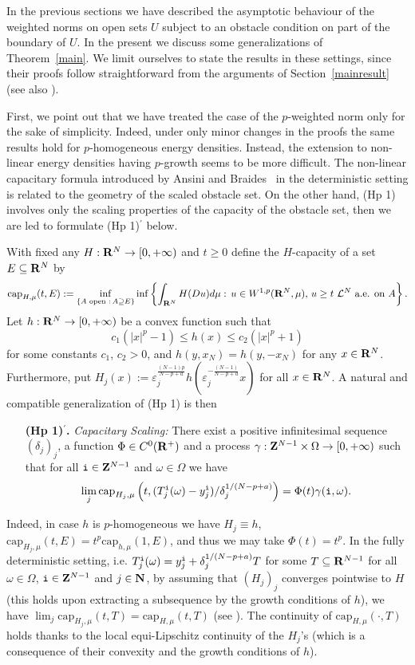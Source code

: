 \documentclass[10pt,reqno]{amsart}
\numberwithin{equation}{section}
\def\L{{\mathcal L}}
\def\N{{\bf N}}
\def\R{{\bf R}}
\def\Z{{\bf Z}}
\def\eps{{\varepsilon}_j}
\def\ii{{\tt i}}
\def\Wsp{W^{1,p}}
\def\Om{\Omega}
\def\om{\omega}
\def\deltaj{\delta_j}
\def\deltae{\delta_{j}}
\def\Teioe{T_{j}^\ii(\om)}
\def\Teio{T_{j}^\ii(\om)}
\def\gammaio{\gamma(\ii,\om)}
\def\xijo{y_j^{\ii}}
\begin{document}
In the previous sections we have described the asymptotic behaviour of
the weighted norms on open sets $U$ subject to an obstacle condition
on part of the boundary of $U$.
In the present we discuss some generalizations of Theorem~\ref{main}.
We limit ourselves to state the results %
in these settings, since their proofs follow straightforward from the
arguments of Section~\ref{mainresult} (see also \cite{ANB}).

First, we point out that we have treated the case of the $p$-weighted
norm only for the sake of simplicity. Indeed, under only minor changes
in the proofs the same results hold for $p$-homogeneous energy densities.
Instead, the extension to non-linear energy densities having $p$-growth
seems to be more difficult. The non-linear capacitary formula introduced
by Ansini and Braides~\cite{ANB} in the deterministic setting is related
to the geometry of the scaled obstacle set. On the other hand, (Hp 1)
involves only the scaling properties of the capacity of the obstacle set,
then we are led to formulate (Hp 1)$^\prime$ below.

With fixed any $H:\R^N\to[0,+\infty)$ and $t\geq 0$ define the %
$H$-capacity of a set $E\subseteq\R^N$ by
$$
\mathrm{cap}_{H,\mu}(t,E):=\inf_{\{A \text{ open }:\,A \supseteq E\}}
\inf\left\{\int_{\R^N}H(Du)d\mu:\,u\in\Wsp(\R^N,\mu),\,
u\geq t\,\, \L^N \text{ a.e. on } A\right\}.
$$
Let $h:\R^N\to[0,+\infty)$ be a convex function such that
$$
c_1(|x|^p-1)\leq h(x)\leq c_2(|x|^p+1)
$$
for some constants $c_1$, $c_2>0$, and $h(y,x_N)=h(y,-x_N)$ for any 
$x\in\R^N$. Furthermore, put 
$H_j(x):=\eps^{\frac{(N-1)p}{N-p+a}}h\left(\eps^{-\frac{(N-1)}{N-p+a}}x\right)$
for all $x\in\R^N$.
A natural and compatible generalization of (Hp 1) is then
\begin{itemize}
\item[{\bf (Hp 1)$^\prime$.}] \emph{Capacitary Scaling:}
There exist a positive infinitesimal sequence $(\deltaj)_j$, a
function $\Phi\in C^0(\R^+)$ and
a process $\gamma:\Z^{N-1}\times\Om\to[0,+\infty)$ such that
for all $\ii\in\Z^{N-1}$ and $\om\in\Om$ we have
$$
\lim_j\mathrm{cap}_{H_j,\mu}\left(t,(\Teioe-\xijo)/\deltae^{1/(N-p+a)}\right)
=\Phi(t)\gammaio.
$$
\end{itemize}
Indeed, in case $h$ is $p$-homogeneous we have $H_j\equiv h$,
$\mathrm{cap}_{H_j,\mu}(t,E)=t^p\mathrm{cap}_{h,\mu}(1,E)$, and
thus we may take $\Phi(t)=t^p$. In the fully deterministic
setting,
i.e. $\Teio=\xijo+\deltaj^{1/(N-p+a)}T$ for some $T\subseteq\R^{N-1}$ 
for all $\om\in\Om$, $\ii\in\Z^{N-1}$ and $j\in\N$,
by assuming that $(H_j)_j$ converges pointwise to $H$ (this holds
upon extracting a subsequence by the growth conditions of $h$), we have
$\lim_j\mathrm{cap}_{H_j,\mu}(t,T)=\mathrm{cap}_{H,\mu}(t,T)$
(see \cite[Proposition 12.8]{BDF}). The continuity of
$\mathrm{cap}_{H,\mu}(\cdot,T)$ holds thanks to the local equi-Lipschitz
continuity of the $H_j$'s (which is a consequence of their 
convexity and the growth conditions of $h$).
\end{document}

